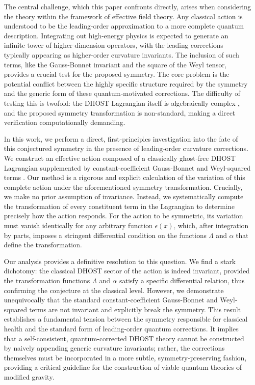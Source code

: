 \documentclass[twocolumn]{aastex631}
\begin{document}
The central challenge, which this paper confronts directly, arises when considering the theory within the framework of effective field theory. Any classical action is understood to be the leading-order approximation to a more complete quantum description. Integrating out high-energy physics is expected to generate an infinite tower of higher-dimension operators, with the leading corrections typically appearing as higher-order curvature invariants. The inclusion of such terms, like the Gauss-Bonnet invariant and the square of the Weyl tensor, provides a crucial test for the proposed symmetry. The core problem is the potential conflict between the highly specific structure required by the symmetry and the generic form of these quantum-motivated corrections. The difficulty of testing this is twofold: the DHOST Lagrangian itself is algebraically complex \citep{langlois2018degeneratehigherorderscalartensordhost}, and the proposed symmetry transformation is non-standard, making a direct verification computationally demanding.

In this work, we perform a direct, first-principles investigation into the fate of this conjectured symmetry in the presence of leading-order curvature corrections. We construct an effective action composed of a classically ghost-free DHOST Lagrangian \citep{babichev2023rotatingblackholesembedded,brax2025primordialgravitationalwavesdhost} supplemented by constant-coefficient Gauss-Bonnet and Weyl-squared terms \citep{cisterna2025thermodynamicsfourdimensionalregularblack}. Our method is a rigorous and explicit calculation of the variation of this complete action under the aforementioned symmetry transformation. Crucially, we make no prior assumption of invariance. Instead, we systematically compute the transformation of every constituent term in the Lagrangian to determine precisely how the action responds. For the action to be symmetric, its variation must vanish identically for any arbitrary function $\epsilon(x)$, which, after integration by parts, imposes a stringent differential condition on the functions $\Lambda$ and $\alpha$ that define the transformation.

Our analysis provides a definitive resolution to this question. We find a stark dichotomy: the classical DHOST sector of the action is indeed invariant, provided the transformation functions $\Lambda$ and $\alpha$ satisfy a specific differential relation, thus confirming the conjecture at the classical level. However, we demonstrate unequivocally that the standard constant-coefficient Gauss-Bonnet and Weyl-squared terms are not invariant and explicitly break the symmetry. This result establishes a fundamental tension between the symmetry responsible for classical health and the standard form of leading-order quantum corrections. It implies that a self-consistent, quantum-corrected DHOST theory cannot be constructed by naively appending generic curvature invariants; rather, the corrections themselves must be incorporated in a more subtle, symmetry-preserving fashion, providing a critical guideline for the construction of viable quantum theories of modified gravity.
\end{document}
